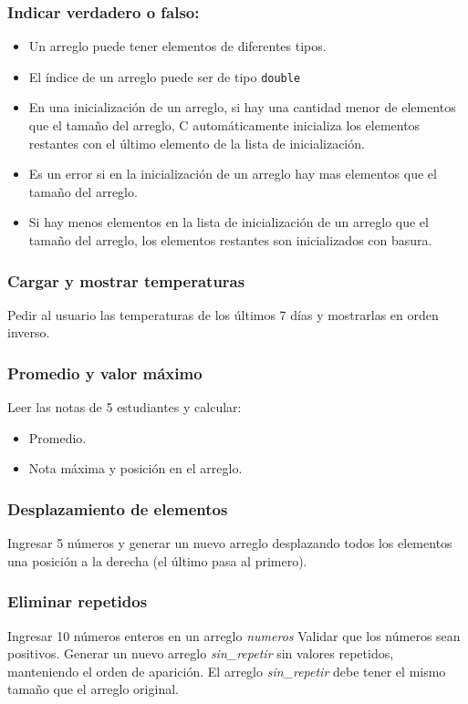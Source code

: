 \subsubsection{Indicar verdadero o falso:}
\begin{itemize}
  \item Un arreglo puede tener elementos de diferentes tipos.
  \item El índice de un arreglo puede ser de tipo \texttt{double}
  \item En una inicialización de un arreglo, si hay una cantidad menor de elementos que el tamaño del arreglo, C automáticamente inicializa los elementos restantes con el último elemento de la lista de inicialización.
  \item Es un error si en la inicialización de un arreglo hay mas elementos que el tamaño del arreglo.
  \item Si hay menos elementos en la lista de inicialización de un arreglo que el tamaño del arreglo, los elementos restantes son inicializados con basura.
\end{itemize}

\subsubsection{Cargar y mostrar temperaturas}
Pedir al usuario las temperaturas de los últimos 7 días y mostrarlas en orden inverso.
\subsubsection{Promedio y valor máximo}
Leer las notas de 5 estudiantes y calcular:
\begin{itemize}
    \item Promedio.
    \item Nota máxima y posición en el arreglo.
\end{itemize}
\subsubsection{Desplazamiento de elementos}
Ingresar 5 números y generar un nuevo arreglo desplazando todos los elementos una posición a la derecha (el último pasa al primero).

\subsubsection{Eliminar repetidos}
Ingresar 10 números enteros en un arreglo \textit{numeros}
Validar que los números sean positivos.
Generar un nuevo arreglo \textit{sin\_repetir} sin valores repetidos, manteniendo el orden de aparición.
El arreglo \textit{sin\_repetir} debe tener el mismo tamaño que el arreglo original.

